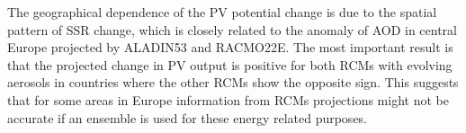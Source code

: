 

The geographical dependence of the PV potential change is due to the spatial pattern of SSR change, which is closely related to the anomaly of AOD in central Europe projected by ALADIN53 and RACMO22E. The most important result is that the projected change in PV output is positive for both RCMs with evolving aerosols in countries where the other RCMs show the opposite sign. This suggests that for some areas in Europe information from RCMs projections might not be accurate if an ensemble is used for these energy related purposes.

